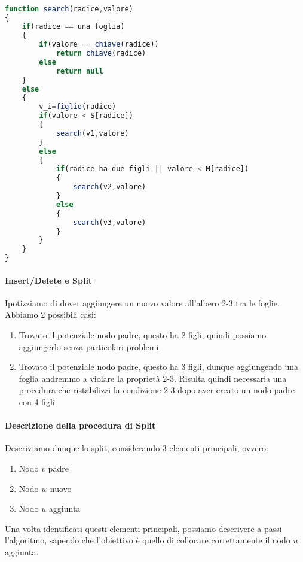 \documentclass{article}
\begin{document}
\newpage

\begin{lstlisting}[language=JavaScript]

function search(radice,valore)
{
	if(radice == una foglia)
	{
		if(valore == chiave(radice))
			return chiave(radice)
		else
			return null
	}
	else
	{
		v_i=figlio(radice)
		if(valore < S[radice])
		{
			search(v1,valore)
		}
		else
		{
			if(radice ha due figli || valore < M[radice])
			{
				search(v2,valore)
			}
			else
			{
				search(v3,valore)
			}
		}
	}
}

\end{lstlisting}

\newpage

\paragraph{Insert/Delete e Split} Ipotizziamo di dover aggiungere un nuovo valore all'albero 2-3 tra le foglie. Abbiamo 2 possibili casi:

\begin{enumerate}
    \item Trovato il potenziale nodo padre, questo ha 2 figli, quindi possiamo aggiungerlo senza particolari problemi
    \item Trovato il potenziale nodo padre, questo ha 3 figli, dunque aggiungendo una foglia andremmo a violare la proprietà 2-3. Risulta quindi necessaria una procedura che ristabilizzi la condizione 2-3 dopo aver creato un nodo padre con 4 figli
\end{enumerate}

\paragraph{Descrizione della procedura di Split}

Descriviamo dunque lo split, considerando 3 elementi principali, ovvero:
\begin{enumerate}
    \item Nodo $v$ padre
    \item Nodo $w$ nuovo
    \item Nodo $u$ aggiunta
\end{enumerate}

Una volta identificati questi elementi principali, possiamo descrivere a passi l'algoritmo, sapendo che l'obiettivo è quello di collocare correttamente il nodo $u$ aggiunta.
\end{document}
